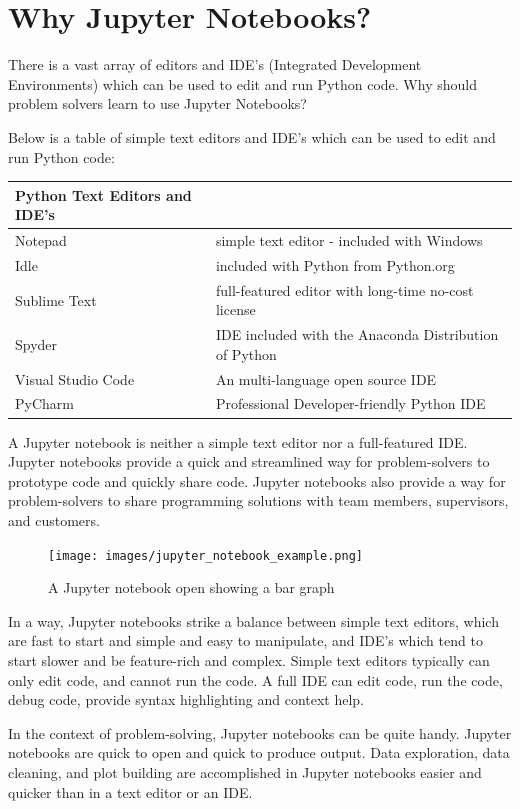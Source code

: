 \documentclass{book}
\begin{document}
    
        \section{Why Jupyter Notebooks?}\label{why-jupyter-notebooks}
    




    
        There is a vast array of editors and IDE's (Integrated Development
Environments) which can be used to edit and run Python code. Why should
problem solvers learn to use Jupyter Notebooks?

Below is a table of simple text editors and IDE's which can be used to
edit and run Python code:

\begin{longtable}[]{@{}ll@{}}
\toprule
Python Text Editors and IDE's &\tabularnewline
\midrule
\endhead
Notepad & simple text editor - included with Windows\tabularnewline
Idle & included with Python from Python.org\tabularnewline
Sublime Text & full-featured editor with long-time no-cost
license\tabularnewline
Spyder & IDE included with the Anaconda Distribution of
Python\tabularnewline
Visual Studio Code & An multi-language open source IDE\tabularnewline
PyCharm & Professional Developer-friendly Python IDE\tabularnewline
\bottomrule
\end{longtable}

A Jupyter notebook is neither a simple text editor nor a full-featured
IDE. Jupyter notebooks provide a quick and streamlined way for
problem-solvers to prototype code and quickly share code. Jupyter
notebooks also provide a way for problem-solvers to share programming
solutions with team members, supervisors, and customers.

\begin{figure}
\centering
\texttt{[image: images/jupyter\_notebook\_example.png]}
\caption{A Jupyter notebook open showing a bar graph}
\end{figure}

In a way, Jupyter notebooks strike a balance between simple text
editors, which are fast to start and simple and easy to manipulate, and
IDE's which tend to start slower and be feature-rich and complex. Simple
text editors typically can only edit code, and cannot run the code. A
full IDE can edit code, run the code, debug code, provide syntax
highlighting and context help.
    




    
        In the context of problem-solving, Jupyter notebooks can be quite handy.
Jupyter notebooks are quick to open and quick to produce output. Data
exploration, data cleaning, and plot building are accomplished in
Jupyter notebooks easier and quicker than in a text editor or an IDE.
\end{document}
